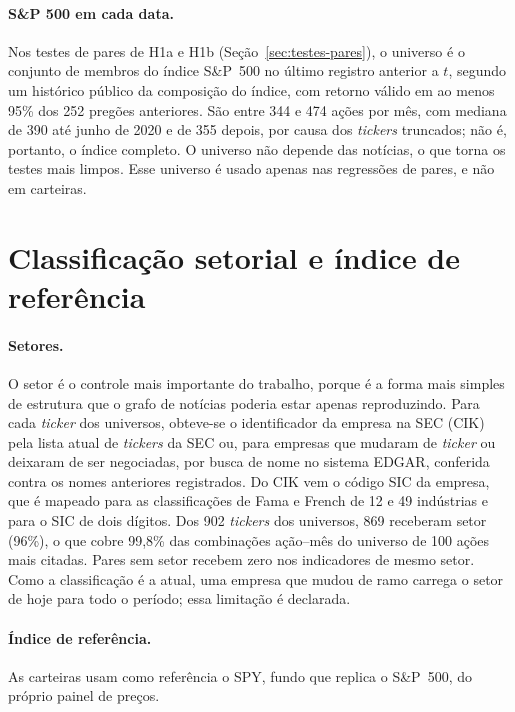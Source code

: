 \paragraph{S\&P 500 em cada data.} Nos testes de pares de H1a e H1b (Seção~\ref{sec:testes-pares}), o
universo é o conjunto de membros do índice S\&P~500 no último registro anterior a $t$, segundo um
histórico público da composição do índice, com retorno válido em ao menos 95\% dos 252 pregões
anteriores. São entre 344 e 474 ações por mês, com mediana de 390 até junho de 2020 e de 355 depois, por
causa dos \emph{tickers} truncados; não é, portanto, o índice completo. O universo não depende das
notícias, o que torna os testes mais limpos. Esse universo é usado apenas nas regressões de pares, e não em
carteiras.

\section{Classificação setorial e índice de referência}
\label{sec:setores}

\paragraph{Setores.} O setor é o controle mais importante do trabalho, porque é a forma mais simples de
estrutura que o grafo de notícias poderia estar apenas reproduzindo. Para cada \emph{ticker} dos
universos, obteve-se o identificador da empresa na SEC (CIK) pela lista atual de \emph{tickers} da SEC
ou, para empresas que mudaram de \emph{ticker} ou deixaram de ser negociadas, por busca de nome no
sistema EDGAR, conferida contra os nomes anteriores registrados. Do CIK vem o código SIC da empresa,
que é mapeado para as classificações de Fama e French de 12 e 49 indústrias e para o SIC de dois
dígitos. Dos 902 \emph{tickers} dos universos, 869 receberam setor (96\%), o que cobre 99,8\% das
combinações ação--mês do universo de 100 ações mais citadas. Pares sem setor recebem zero nos
indicadores de mesmo setor. Como a classificação é a atual, uma empresa que mudou de ramo carrega o
setor de hoje para todo o período; essa limitação é declarada.

\paragraph{Índice de referência.} As carteiras usam como referência o SPY, fundo que replica o
S\&P~500, do próprio painel de preços.

\clearpage
